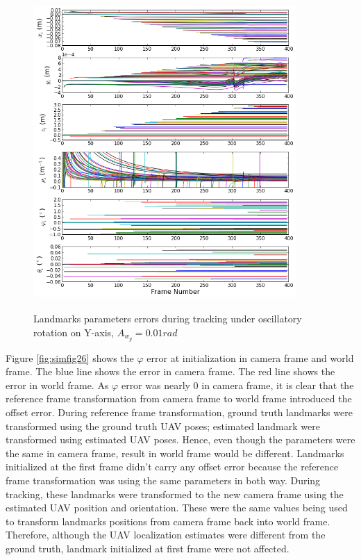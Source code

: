 \begin{figure}[h]
  \centering
  \includegraphics[width=10cm, height=12cm]{./Figures/SimulationFigures/Figure25.png}
  \caption{Landmarks parameters errors during tracking under
    oscillatory rotation on Y-axis, $A_{w_y}=0.01rad$}
  \label{fig:simfig25}
\end{figure}
\FloatBarrier

Figure \ref{fig:simfig26} shows the $\varphi$ error at initialization
in camera frame and world frame. The blue line shows the error in
camera frame. The red line shows the error in world frame. As
$\varphi$ error was nearly 0 in camera frame, it is clear that the
reference frame transformation from camera frame to world frame
introduced the offset error. During reference frame transformation,
ground truth landmarks were transformed using the ground truth UAV
poses; estimated landmark were transformed using estimated UAV poses.
Hence, even though the parameters were the same in camera frame,
result in world frame would be different. Landmarks initialized at the
first frame didn't carry any offset error because the reference frame
transformation was using the same parameters in both way. During
tracking, these landmarks were transformed to the new camera frame
using the estimated UAV position and orientation. These were the same
values being used to transform landmarks positions from camera frame
back into world frame. Therefore, although the UAV localization
estimates were different from the ground truth, landmark initialized
at first frame were not affected.

